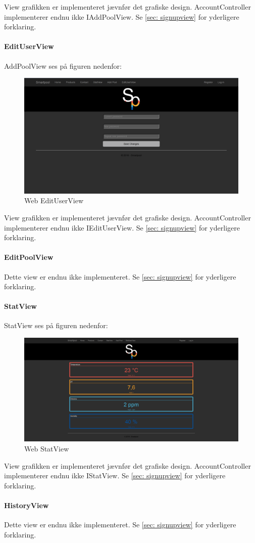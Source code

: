 View grafikken er implementeret jævnfør det grafiske design. AccountController implementerer endnu ikke IAddPoolView. Se \ref{sec: signupview} for yderligere forklaring.

\paragraph{EditUserView}
AddPoolView ses på figuren nedenfor:

\begin{figure}
	\centering
	\includegraphics[width=1.0\linewidth]{figs/implementering/web_edituserview}
	\caption{Web EditUserView}
	\label{fig:webedituserview}
\end{figure}

View grafikken er implementeret jævnfør det grafiske design. AccountController implementerer endnu ikke IEditUserView. Se \ref{sec: signupview} for yderligere forklaring.

\paragraph{EditPoolView}
Dette view er endnu ikke implementeret. Se \ref{sec: signupview} for yderligere forklaring.

\paragraph{StatView}
StatView ses på figuren nedenfor:

\begin{figure}
	\centering
	\includegraphics[width=1.0\linewidth]{figs/implementering/web_statview}
	\caption{Web StatView}
	\label{fig:webstatview}
\end{figure}

View grafikken er implementeret jævnfør det grafiske design. AccountController implementerer endnu ikke IStatView. Se \ref{sec: signupview} for yderligere forklaring.

\paragraph{HistoryView}

Dette view er endnu ikke implementeret. Se \ref{sec: signupview} for yderligere forklaring.

